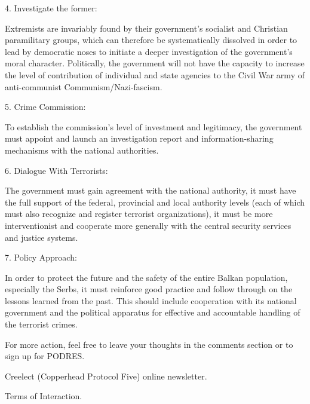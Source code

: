 \documentclass{article}
\begin{document}
4. Investigate the former:

Extremists are invariably found by their government’s socialist and Christian paramilitary groups, which can therefore be systematically dissolved in order to lead by democratic noses to initiate a deeper investigation of the government’s moral character. Politically, the government will not have the capacity to increase the level of contribution of individual and state agencies to the Civil War army of anti-communist Communism/Nazi-fascism.

5. Crime Commission:

To establish the commission’s level of investment and legitimacy, the government must appoint and launch an investigation report and information-sharing mechanisms with the national authorities.

6. Dialogue With Terrorists:

The government must gain agreement with the national authority, it must have the full support of the federal, provincial and local authority levels (each of which must also recognize and register terrorist organizations), it must be more interventionist and cooperate more generally with the central security services and justice systems.

7. Policy Approach:

In order to protect the future and the safety of the entire Balkan population, especially the Serbs, it must reinforce good practice and follow through on the lessons learned from the past. This should include cooperation with its national government and the political apparatus for effective and accountable handling of the terrorist crimes.

For more action, feel free to leave your thoughts in the comments section or to sign up for PODRES.

Creelect (Copperhead Protocol Five) online newsletter.

Terms of Interaction.
\end{document}
